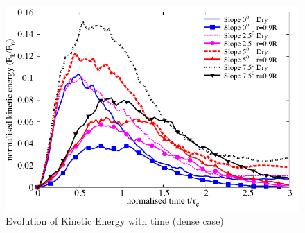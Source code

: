 \begin{figure}
\centering
\includegraphics[width=0.97\columnwidth]{KE_dense_slope}
\caption{Evolution of Kinetic Energy with time (dense case)}
\label{fig:KE_dense}
\end{figure}


